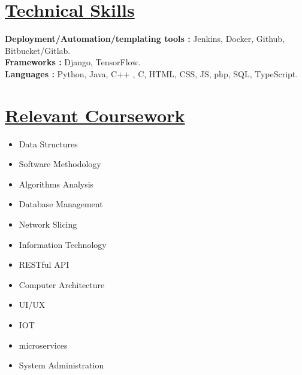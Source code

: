\documentclass[letterpaper,11pt]{article}
\newcommand{\resumeSubHeadingListStart}{\begin{itemize}[leftmargin=0.0in, label={}]}
\newcommand{\resumeSubHeadingListEnd}{\end{itemize}}
\begin{document}
\section{\href{https://www.linkedin.com/in/yakkshit/details/skills/}{Technical Skills} \faLink}
 \begin{itemize}[leftmargin=0.15in, label={}]
    \small{\item{
     \textbf{Deployment/Automation/templating tools : }{Jenkins, Docker, Github, Bitbucket/Gitlab.} \\
     \textbf{Frameworks : }{Django, TensorFlow.}\\
     \textbf{Languages : }{ Python, Java, C++ , C, HTML, CSS, JS, php, SQL, TypeScript.}\\
    }}
 \end{itemize}
\section{\href{https://www.linkedin.com/in/yakkshit/details/courses/}{Relevant Coursework} \faLink}
        \begin{multicols}{4}
            \begin{itemize}[itemsep=-4pt, parsep=3pt]
                \item\small Data Structures
                \item Software Methodology
                \item Algorithms Analysis
                \item Database Management
                \item Network Slicing
                \item Information Technology
                \item RESTful API
                \item Computer Architecture \\
                \item UI/UX
                \item IOT
                \item microservices
                \item System Administration\\
            \end{itemize}
        \end{multicols}
        \vspace*{2.0\multicolsep}
\end{document}
